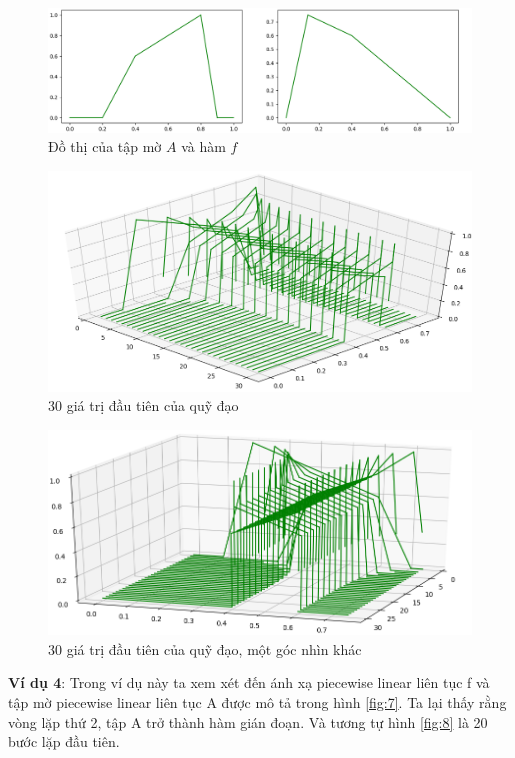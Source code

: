 \documentclass[../report.tex]{subfiles}
\begin{document}
\begin{figure}[H]
\includegraphics[width=\textwidth]{figures/example3.png}
\caption{Đồ thị của tập mờ $A$ và hàm $f$}
\label{fig:4}
\end{figure}

\begin{figure}[H]
\includegraphics[width=\textwidth]{figures/example3_3d.png}
\caption{30 giá trị đầu tiên của quỹ đạo}
\label{fig:5}
\end{figure}

\begin{figure}[H]
\includegraphics[width=\textwidth]{figures/example3_3d_2.png}
\caption{30 giá trị đầu tiên của quỹ đạo, một góc nhìn khác}
\label{fig:6}
\end{figure}

\noindent \textbf{Ví dụ 4}: Trong ví dụ này ta xem xét đến ánh 
xạ piecewise linear liên tục f và tập mờ piecewise linear 
liên tục A được mô tả trong hình \ref{fig:7}. Ta lại thấy 
rằng vòng lặp thứ 2, tập A trở thành hàm gián đoạn.
Và tương tự hình \ref{fig:8} là 20 bước lặp đầu tiên. 
\end{document}
